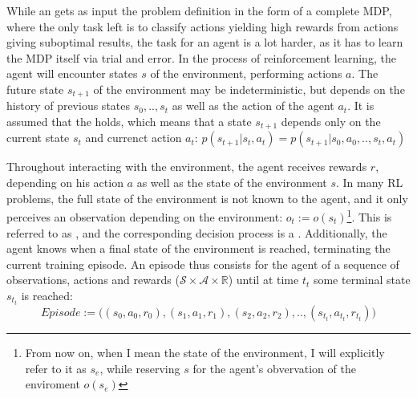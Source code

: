 \noindent While an  gets as input the problem definition in the form of a complete MDP, where the only task left is to classify actions yielding high rewards from actions giving suboptimal results, the task for an  agent is a lot harder, as it has to learn the MDP itself via trial and error. In the process of reinforcement learning, the agent will encounter states $s$ of the environment, performing actions $a$. The future state $s_{t+1}$ of the environment may be indeterministic, but depends on the history of previous states $s_0, .., s_t$ as well as the action of the agent $a_t$. It is assumed that the  holds, which means that a state  $s_{t+1}$ depends only on the current state $s_t$ and currenct action $a_t$: $p(s_{t+1}|s_t,a_t) = p(s_{t+1}|s_0,a_0,..,s_t,a_t)$

Throughout interacting with the environment, the agent receives rewards $r$, depending on his action $a$ as well as the state of the environment $s$. In many RL problems, the full state of the environment is not known to the agent, and it only perceives an observation depending on the environment: $o_t := o(s_t)$\footnote{From now on, when I mean the state of the environment, I will explicitly refer to it as $s_e$, while reserving $s$ for the agent's obvervation of the enviroment $o(s_e)$}. This is referred to as , and the corresponding decision process is a . Additionally, the agent knows when a final state of the environment is reached, terminating the current training episode. An episode thus consists for the agent of a sequence of observations, actions and rewards ($\mathcal{S} \times \mathcal{A} \times \mathds{R}$) until at time $t_t$ some terminal state $s_{t_t}$ is reached: $$Episode := \big((s_0, a_0, r_0), (s_1, a_1, r_1), (s_2,a_2,r_2), .., (s_{t_t}, a_{t_t}, r_{t_t})\big)$$

